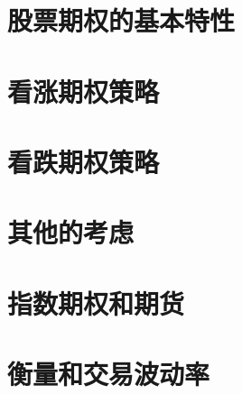 \documentclass{book}
\begin{document}
\mainmatter
\part{股票期权的基本特性}
\part{看涨期权策略}
\part{看跌期权策略}
\part{其他的考虑}
\part{指数期权和期货}
\part{衡量和交易波动率}
\end{document}
